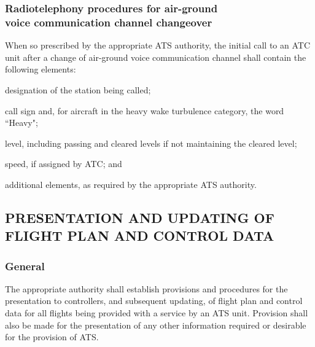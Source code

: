 \documentclass[../main.tex]{subfiles}
\begin{document}
    \subsubsection[Radiotelephony procedures for air-ground voice communication channel changeover]{Radiotelephony procedures for air-ground \\ voice communication channel changeover} \label{4.11.3}

    When so prescribed by the appropriate ATS authority, the initial call to an ATC unit after a change of air-ground voice communication channel shall contain the following elements:
    
    \begin{enumalph}
        \item designation of the station being called;
        \item call sign and, for aircraft in the heavy wake turbulence category, the word ``Heavy";
        \item level, including passing and cleared levels if not maintaining the cleared level;
        \item speed, if assigned by ATC; and
        \item additional elements, as required by the appropriate ATS authority.
    \end{enumalph}



    \subsection[Presentation and updating of flight plan and control data]{PRESENTATION AND UPDATING OF \\ FLIGHT PLAN AND CONTROL DATA}

    \subsubsection{General}

    The appropriate authority shall establish provisions and procedures for the presentation to controllers, and subsequent updating, of flight plan and control data for all flights being provided with a service by an ATS unit. Provision shall also be made for the presentation of any other information required or desirable for the provision of ATS.
\end{document}
